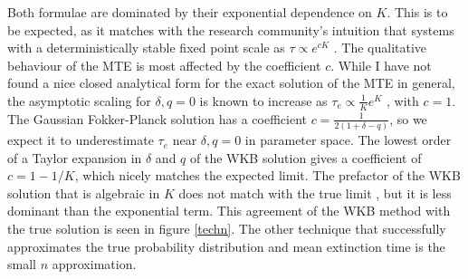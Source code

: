 Both formulae are dominated by their exponential dependence on $K$. 
This is to be expected, as it matches with the research community's intuition that systems with a deterministically stable fixed point scale as $\tau \propto e^{cK}$ \cite{Leigh1981,Lande1993,Kamenev2008,Cremer2009a,Dobrinevski2012,Yu2017}. 
The qualitative behaviour of the MTE is most affected by the coefficient $c$. %
While I have not found a nice closed analytical form for the exact solution of the MTE in general, the asymptotic scaling for $\delta,q = 0$ is known to increase as $\tau_e \propto \frac{1}{K}e^K$ \cite{Lande1993,Lambert2005}, with $c=1$. 
The Gaussian Fokker-Planck solution has a coefficient $c=\frac{1}{2(1+\delta-q)}$, so we expect it to underestimate $\tau_e$ near $\delta,q = 0$ in parameter space. %
The lowest order of a Taylor expansion in $\delta$ and $q$ of the WKB solution gives a coefficient of $c=1-1/K$, which nicely matches the expected limit. 
The prefactor of the WKB solution that is algebraic in $K$ does not match with the true limit \cite{Assaf2010,Badali2019a,Badali2019b}, but it is less dominant than the exponential term. 
This agreement of the WKB method with the true solution is seen in figure \ref{techn}. 
The other technique that successfully approximates the true probability distribution and mean extinction time is the small $n$ approximation. %
